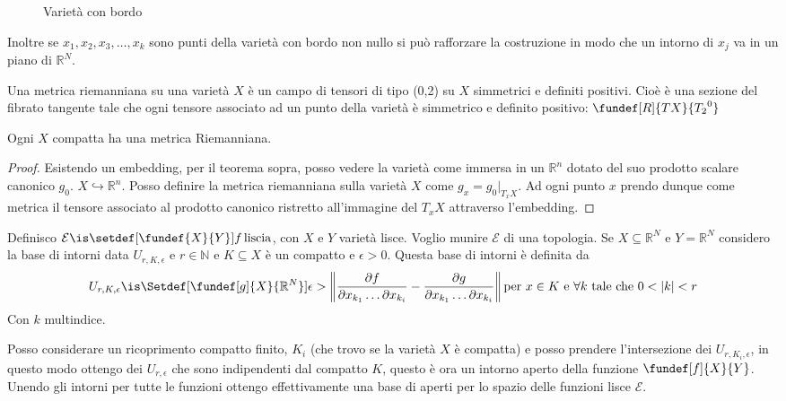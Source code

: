 \begin{figure}
    \centering %
    
    \caption{Varietà con bordo}
\end{figure}

Inoltre se $x_{1}, x_{2}, x_{3}, \dots, x_{k}$ sono punti della varietà con bordo non nullo si può rafforzare la costruzione in modo che un intorno di $x_{j}$ va in un piano di $\mathbb{R}^{N}$.

\begin{defn} %
 Una metrica riemanniana su una varietà $X$ è un campo di tensori di tipo (0,2) su $X$ simmetrici e definiti positivi. Cioè è una sezione del 
 fibrato tangente tale che ogni tensore associato ad un punto della varietà è simmetrico e definito positivo: $\fundef[R]{TX}{{T_{2}}^{0}}$ 
\end{defn}

\begin{teo}
Ogni $X$ compatta ha una metrica Riemanniana.
\end{teo}

\begin{proof}
  Esistendo un embedding, per il teorema sopra, posso vedere la varietà come immersa in un $\mathbb{R}^{n}$ dotato del suo prodotto scalare canonico $g_{0}$. $X \hookrightarrow \mathbb{R}^{n}$.
  Posso definire la metrica riemanniana sulla varietà $X$ come $g_{x} = g_{0}|_{T_x X}$.
 Ad ogni punto $x$ prendo dunque come metrica il tensore associato al prodotto canonico ristretto all'immagine del $T_x X$ attraverso l'embedding.
\end{proof}




\begin{defn}
Definisco $\mathcal{E} \is \setdef[\fundef{X}{Y}]{f \, \text{liscia}}$, con $X$ e $Y$ varietà lisce. Voglio munire $\mathcal{E}$ di una topologia.
Se $X \subseteq \mathbb{R}^{N}$ e $Y = \mathbb{R}^{N}$ considero la base di intorni data $U_{r, K, \epsilon}$ e $r \in \mathbb{N}$ e $K \subseteq X$  è un compatto e $\epsilon > 0$. Questa base di intorni è definita da 
\[U_{r, K, \epsilon} \is \Setdef[{\fundef[g]{X}{\mathbb{R}^{N}}}]{\epsilon > \left\|\frac{\partial f}{\partial x_{k_{1}} \dots \partial x_{k_{i}}} - \frac{\partial g}{\partial x_{k_{1}} \dots \partial x_{k_{i}}}\right\| \text{per } x \in K \text{ e } \forall k \text{ tale che } 0<|k|<r}\]
Con $k$ multindice.

Posso considerare un ricoprimento compatto finito,  ${K_i}$ (che trovo se la varietà $X$ è compatta) e posso prendere l'intersezione dei $U_{r,K_i, \epsilon}$, in questo modo ottengo
dei $U_{r, \epsilon}$ che sono indipendenti dal compatto $K$, questo è ora un intorno aperto della funzione $\fundef[f]{X}{Y}$. 
Unendo gli intorni per tutte le funzioni ottengo effettivamente una base di aperti per lo spazio delle funzioni lisce $\mathcal{E}$.
\end{defn}

